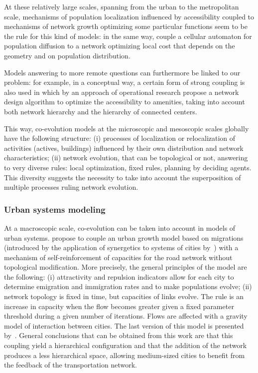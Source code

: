 At these relatively large scales, spanning from the urban to the metropolitan scale, mechanisms of population localization influenced by accessibility coupled to mechanisms of network growth optimizing some particular functions seem to be the rule for this kind of models: in the same way, \cite{wu2017city} couple a cellular automaton for population diffusion to a network optimizing local cost that depends on the geometry and on population distribution.


Models answering to more remote questions can furthermore be linked to our problem: for example, in a conceptual way, a certain form of strong coupling is also used in \citep{bigotte2010integrated} which by an approach of operational research propose a network design algorithm to optimize the accessibility to amenities, taking into account both network hierarchy and the hierarchy of connected centers.


This way, co-evolution models at the microscopic and mesoscopic scales globally have the following structure: (i) processes of localization or relocalization of activities (actives, buildings) influenced by their own distribution and network characteristics; (ii) network evolution, that can be topological or not, answering to very diverse rules: local optimization, fixed rules, planning by deciding agents. This diversity suggests the necessity to take into account the superposition of multiple processes ruling network evolution.


\subsubsection{Urban systems modeling}

At a macroscopic scale, co-evolution can be taken into account in models of urban systems. \cite{baptiste1999interactions} propose to couple an urban growth model based on migrations (introduced by the application of synergetics to systems of cities by~\citep{sanders1992systeme}) with a mechanism of self-reinforcement of capacities for the road network without topological modification. More precisely, the general principles of the model are the following: (i) attractivity and repulsion indicators allow for each city to determine emigration and immigration rates and to make populations evolve; (ii) network topology is fixed in time, but capacities of links evolve. The rule is an increase in capacity when the flow becomes greater given a fixed parameter threshold during a given number of iterations. Flows are affected with a gravity model of interaction between cities. The last version of this model is presented by~\cite{baptistemodeling}. General conclusions that can be obtained from this work are that this coupling yield a hierarchical configuration and that the addition of the network produces a less hierarchical space, allowing medium-sized cities to benefit from the feedback of the transportation network. 


